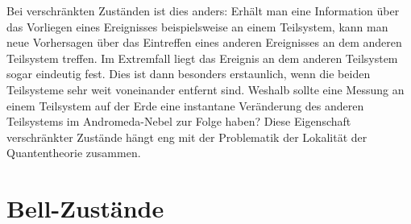 Bei verschr\"ankten Zust\"anden ist dies anders: Erh\"alt man eine Information \"uber das Vorliegen eines
Ereignisses beispielsweise an einem Teilsystem, kann man neue Vorhersagen \"uber das Eintreffen eines 
anderen Ereignisses an dem anderen Teilsystem treffen. Im Extremfall liegt das Ereignis an dem anderen
Teilsystem sogar eindeutig fest. Dies ist dann besonders erstaunlich, wenn die beiden Teilsysteme
sehr weit voneinander entfernt sind. Weshalb sollte eine Messung an einem Teilsystem auf der Erde
eine instantane Ver\"anderung des anderen Teilsystems im Andromeda-Nebel zur Folge haben? Diese
Eigenschaft verschr\"ankter Zust\"ande h\"angt eng mit der Problematik der Lokalit\"at der Quantentheorie
zusammen. 

\section{Bell-Zust\"ande}

